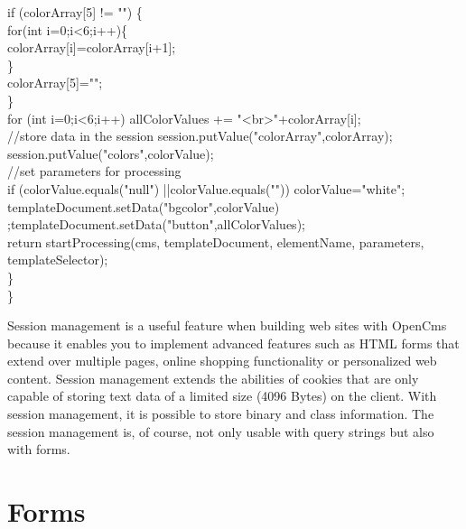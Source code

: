 \begin{java}
\jtabc        if (colorArray[5] != "") \{\\
\jtabd                for(int i=0;i<6;i++)\{\\
\jtabe                        colorArray[i]=colorArray[i+1];\\
\jtabd                \}\\
\jtabd                colorArray[5]="";\\
\jtabc        \}\\
\jtabc        for (int i=0;i<6;i++) allColorValues += "<br>"+colorArray[i];\\
\jtabc        //store data in the session session.putValue("colorArray",colorArray);\\
\jtabd                session.putValue("colors",colorValue);\\
\jtabc        //set parameters for processing\\
\jtabc        if (colorValue.equals("null") ||colorValue.equals("")) colorValue="white";\\
\jtabc        templateDocument.setData("bgcolor",colorValue)
\jtabc        ;templateDocument.setData("button",allColorValues);\\
\jtabc        return startProcessing(cms, templateDocument, elementName,
\jtabc        parameters, templateSelector);\\
\jtabc        \}\\
\}\\
\end{java}

Session management is a useful feature when building web sites with
OpenCms because it enables you to implement advanced features such as
HTML forms that extend over multiple pages, online shopping functionality
or personalized web content. Session management extends the abilities of
cookies that are only capable of storing text data of a limited size
(4096 Bytes) on the client. With session management, it is possible to
store binary and class information. The session management is, of course,
not only usable with query strings but also with forms. 

\section{Forms}


